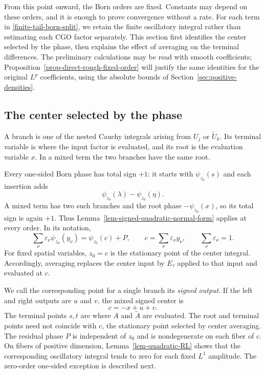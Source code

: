 \documentclass[a4paper,11pt]{article}
\theoremstyle{plain}
\theoremstyle{definition}
\theoremstyle{remark}
\begin{document}
From this point onward, the Born orders are fixed. Constants may depend on these orders, and it is enough to prove convergence without a rate. For each term in \eqref{finite-tail-born-split}, we retain the finite oscillatory integral rather than estimating each CGO factor separately. This section first identifies the center selected by the phase, then explains the effect of averaging on the terminal differences. The preliminary calculations may be read with smooth coefficients; Proposition~\ref{prop-direct-rough-fixed-order} will justify the same identities for the original $L^p$ coefficients, using the absolute bounds of Section~\ref{sec:positive-densities}.

\subsection{The center selected by the phase}\label{subsec-center-meaning}

A branch is one of the nested Cauchy integrals arising from $U_j$ or $\widetilde U_k$. Its terminal variable is where the input factor is evaluated, and its root is the evaluation variable $x$. In a mixed term the two branches have the same root.

Every one-sided Born phase has total sign $+1$: it starts with $\psi_{z_0}(s)$ and each insertion adds
\[
 \psi_{z_0}(\lambda)-\psi_{z_0}(\eta).
\]
A mixed term has two such branches and the root phase $-\psi_{z_0}(x)$, so its total sign is again $+1$. Thus Lemma~\ref{lem-signed-quadratic-normal-form} applies at every order. In its notation,
\[
 \sum_\nu\varepsilon_\nu\psi_{z_0}(y_\nu)
 =\psi_{z_0}(c)+P,
 \qquad c=\sum_\nu\varepsilon_\nu y_\nu,
 \qquad \sum_\nu\varepsilon_\nu=1.
\]
For fixed spatial variables, $z_0=c$ is the stationary point of the center integral. Accordingly, averaging replaces the center input by $E_\tau$ applied to that input and evaluated at $c$.

We call the corresponding point for a single branch its \emph{signed output}. If the left and right outputs are $u$ and $v$, the mixed signed center is
\begin{equation}\label{model-center-rule}
 c=-x+u+v.
\end{equation}
The terminal points $s,t$ are where $A$ and $\widetilde A$ are evaluated. The root and terminal points need not coincide with $c$, the stationary point selected by center averaging. The residual phase $P$ is independent of $z_0$ and is nondegenerate on each fiber of $c$. On fibers of positive dimension, Lemma~\ref{lem-quadratic-RL} shows that the corresponding oscillatory integral tends to zero for each fixed $L^1$ amplitude. The zero-order one-sided exception is described next.
\end{document}
